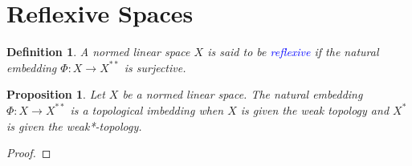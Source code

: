 \documentclass[11pt]{article}
\theoremstyle{thmstyle}
\newtheorem{lemma}[theorem]{Lemma}
\newtheorem{proposition}[theorem]{Proposition}
\theoremstyle{defstyle}
\newtheorem{definition}[theorem]{Definition}
\newcommand{\define}[1]{\textcolor{blue}{\textit{#1}}}
\begin{document}
\section{Reflexive Spaces}

\begin{definition}
    A normed linear space $X$ is said to be \define{reflexive} if the natural embedding $\Phi: X\to X^{\ast\ast}$ is surjective.
\end{definition}

\begin{proposition}
    Let $X$ be a normed linear space. The natural embedding $\Phi: X\to X^{\ast\ast}$ is a topological imbedding when $X$ is given the weak topology and $X^\ast$ is given the weak*-topology.
\end{proposition}
\begin{proof}
\end{proof}
\end{document}
